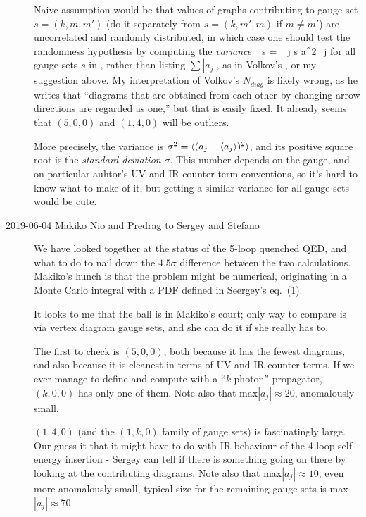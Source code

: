 \begin{description}
Naive assumption would be that values of graphs contributing to gauge set
$s=(k,m,m')$ (do it separately from $s=(k,m',m)$ if $m\neq m'$) are uncorrelated
and randomly distributed, in which case one should test the randomness hypothesis by
computing the \emph{variance}
\beq
{}_{s} = \sum_{j \in s} a^2_j
for all gauge sets $s$ in , rather than listing $\sum
|a_j|$, as in Volkov's , or my suggestion
 above.
My interpretation of Volkov's $N_{diag}$ is likely wrong, as he writes that
``diagrams that are obtained from each other by changing arrow directions are
regarded as one,'' but that is easily fixed. It already seems that
$(5,0,0)$ and $(1,4,0)$ will be outliers.

More precisely, the {variance} is $\sigma^2=\langle {(a_j-\langle {a_j} \rangle)^2} \rangle$,
and its positive square root is the \emph{standard deviation} $\sigma$.
This number depends on the gauge, and on particular auhtor's UV and IR
counter-term conventions, so it's hard to know what to make of it, but
getting a similar variance for all gauge sets would be cute.

\item[2019-06-04 Makiko Nio and Predrag to Sergey and Stefano] We have
looked together at the status of the 5-loop quenched QED, and what to do
to nail down the $4.5 \sigma$ difference between the two calculations.
Makiko's hunch is that the problem might be numerical, originating in a
Monte Carlo integral with a PDF defined in Seergey's 
eq.~(1).

It looks to me that the ball is in Makiko's court; only way to compare is
via vertex diagram gauge sets, and she can do it if she really has to.

The first to check is $(5,0,0)$, both because it has the fewest diagrams,
and also because it is cleanest in terms of UV and IR counter terms. If
we ever manage to define and compute with a ``$k$-photon'' propagator,
$(k,0,0)$ has only one of them. Note also that max$|a_j|\approx 20$,
anomalously small.

$(1,4,0)$ (and the $(1,k,0)$ family of gauge sets) is fascinatingly
large. Our guess it that it might have to do with IR behaviour of the
4-loop self-energy insertion - Sergey can tell if there is something
going on there by looking at the contributing diagrams.
Note also that max$|a_j|\approx 10$, even more anomalously small, typical
size for the remaining gauge sets is max$|a_j|\approx 70$.


\end{description}

